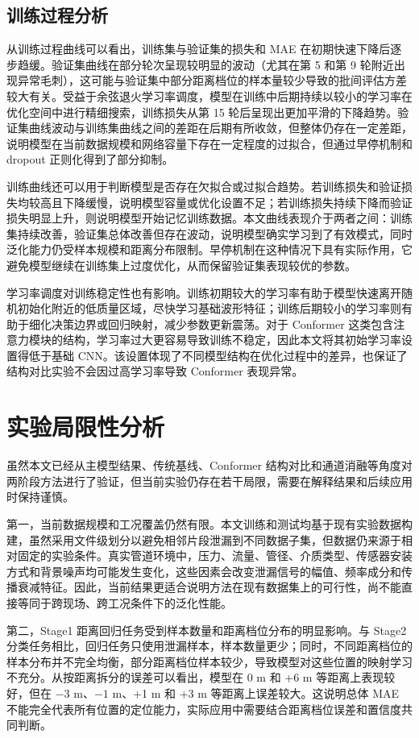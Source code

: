 \subsection{训练过程分析}

从训练过程曲线可以看出，训练集与验证集的损失和 MAE 在初期快速下降后逐步趋缓。验证集曲线在部分轮次呈现较明显的波动（尤其在第 5 和第 9 轮附近出现异常毛刺），这可能与验证集中部分距离档位的样本量较少导致的批间评估方差较大有关。受益于余弦退火学习率调度，模型在训练中后期持续以较小的学习率在优化空间中进行精细搜索，训练损失从第 15 轮后呈现出更加平滑的下降趋势。验证集曲线波动与训练集曲线之间的差距在后期有所收敛，但整体仍存在一定差距，说明模型在当前数据规模和网络容量下存在一定程度的过拟合，但通过早停机制和 dropout 正则化得到了部分抑制。

训练曲线还可以用于判断模型是否存在欠拟合或过拟合趋势。若训练损失和验证损失均较高且下降缓慢，说明模型容量或优化设置不足；若训练损失持续下降而验证损失明显上升，则说明模型开始记忆训练数据。本文曲线表现介于两者之间：训练集持续改善，验证集总体改善但存在波动，说明模型确实学习到了有效模式，同时泛化能力仍受样本规模和距离分布限制。早停机制在这种情况下具有实际作用，它避免模型继续在训练集上过度优化，从而保留验证集表现较优的参数。

学习率调度对训练稳定性也有影响。训练初期较大的学习率有助于模型快速离开随机初始化附近的低质量区域，尽快学习基础波形特征；训练后期较小的学习率则有助于细化决策边界或回归映射，减少参数更新震荡。对于 Conformer 这类包含注意力模块的结构，学习率过大更容易导致训练不稳定，因此本文将其初始学习率设置得低于基础 CNN。该设置体现了不同模型结构在优化过程中的差异，也保证了结构对比实验不会因过高学习率导致 Conformer 表现异常。

\section{实验局限性分析}

虽然本文已经从主模型结果、传统基线、Conformer 结构对比和通道消融等角度对两阶段方法进行了验证，但当前实验仍存在若干局限，需要在解释结果和后续应用时保持谨慎。

第一，当前数据规模和工况覆盖仍然有限。本文训练和测试均基于现有实验数据构建，虽然采用文件级划分以避免相邻片段泄漏到不同数据子集，但数据仍来源于相对固定的实验条件。真实管道环境中，压力、流量、管径、介质类型、传感器安装方式和背景噪声均可能发生变化，这些因素会改变泄漏信号的幅值、频率成分和传播衰减特征。因此，当前结果更适合说明方法在现有数据集上的可行性，尚不能直接等同于跨现场、跨工况条件下的泛化性能。

第二，Stage1 距离回归任务受到样本数量和距离档位分布的明显影响。与 Stage2 分类任务相比，回归任务只使用泄漏样本，样本数量更少；同时，不同距离档位的样本分布并不完全均衡，部分距离档位样本较少，导致模型对这些位置的映射学习不充分。从按距离拆分的误差可以看出，模型在 0 m 和 +6 m 等距离上表现较好，但在 $-3$ m、$-1$ m、+1 m 和 +3 m 等距离上误差较大。这说明总体 MAE 不能完全代表所有位置的定位能力，实际应用中需要结合距离档位误差和置信度共同判断。

